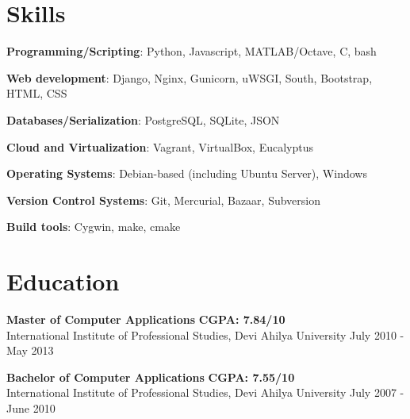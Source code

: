 \documentclass[margin,line]{resume}
\begin{document}
\begin{resume}
\begin{list2}
	\end{list2}

    \section{\mysidestyle Skills} 

    \begin{list2}
	\item \textbf{Programming/Scripting}: \hspace{5mm} Python, Javascript, MATLAB/Octave, C, bash
	\item \textbf{Web development}: \hspace{16mm} Django, Nginx, Gunicorn, uWSGI, South, Bootstrap, HTML, CSS
	\item \textbf{Databases/Serialization}: \hspace{5.7mm} PostgreSQL, SQLite,	JSON
	\item \textbf{Cloud and Virtualization}: \hspace{3mm} Vagrant, VirtualBox, Eucalyptus
	\item \textbf{Operating Systems}: \hspace{13.8mm} Debian-based (including Ubuntu Server), Windows
	\item \textbf{Version Control Systems}: \hspace{3.8mm} Git, Mercurial, Bazaar, Subversion
	\item \textbf{Build tools}: \hspace{28mm} Cygwin, make, cmake
	\end{list2}

    \section{\mysidestyle Education}

    \begin{list2}
	\item \textbf{Master of Computer Applications} \hspace{73mm} \textbf{CGPA: 7.84/10} \\ International Institute of Professional Studies, Devi Ahilya University \hspace{17mm} July 2010 - May 2013
	\end{list2}

	\begin{list2}
	\item \textbf{Bachelor of Computer Applications} \hspace{70mm} \textbf{CGPA: 7.55/10} \\ International Institute of Professional Studies, Devi Ahilya University \hspace{20mm} July 2007 - June 2010
	\end{list2}


\end{resume}
\end{document}
